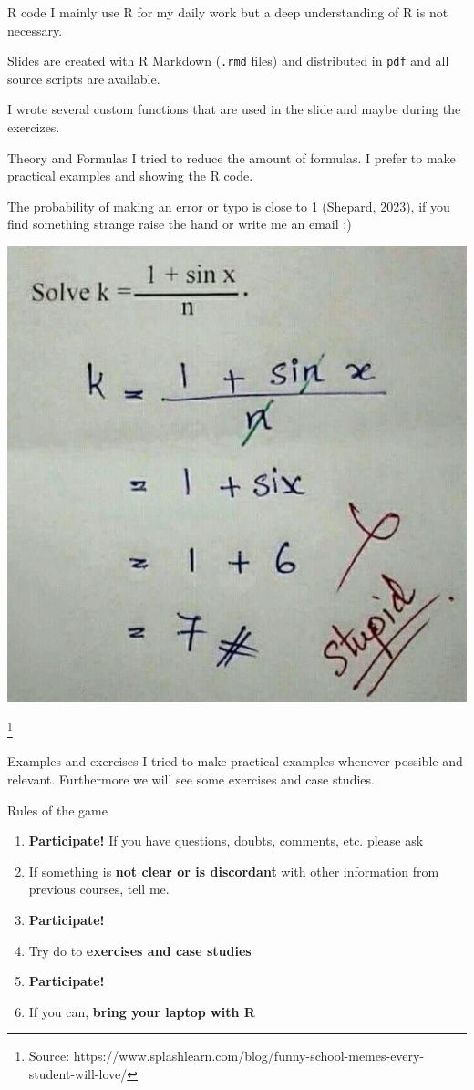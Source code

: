 \documentclass[
  ignorenonframetext,
]{beamer}
\providecommand{\tightlist}{%
  \setlength{\itemsep}{0pt}\setlength{\parskip}{0pt}}
\newcommand\addnote[1]{%
  \begingroup
  \renewcommand\thefootnote{}\footnote{#1}%
  \addtocounter{footnote}{-1}%
  \endgroup
}
\begin{document}
\begin{frame}[fragile]{R code}
\protect\hypertarget{r-code}{}
I mainly use R for my daily work but a deep understanding of R is not
necessary.

Slides are created with R Markdown (\texttt{.rmd} files) and distributed
in \texttt{pdf} and all source scripts are available.

I wrote several custom functions that are used in the slide and maybe
during the exercizes.
\end{frame}

\begin{frame}{Theory and Formulas}
\protect\hypertarget{theory-and-formulas}{}
I tried to reduce the amount of formulas. I prefer to make practical
examples and showing the R code.

The probability of making an error or typo is close to 1 (Shepard,
2023), if you find something strange raise the hand or write me an email
:)

\begin{center}\includegraphics[width=0.3\linewidth]{img/meme-math} \end{center}

\addnote{Source: https://www.splashlearn.com/blog/funny-school-memes-every-student-will-love/}
\end{frame}

\begin{frame}{Examples and exercises}
\protect\hypertarget{examples-and-exercises}{}
I tried to make practical examples whenever possible and relevant.
Furthermore we will see some exercises and case studies.
\end{frame}

\begin{frame}{Rules of the game}
\protect\hypertarget{rules-of-the-game}{}
\begin{enumerate}
\tightlist
\item
  \textbf{Participate!} If you have questions, doubts, comments, etc.
  please ask
\item
  If something is \textbf{not clear or is discordant} with other
  information from previous courses, tell me.
\item
  \textbf{Participate!}
\item
  Try do to \textbf{exercises and case studies}
\item
  \textbf{Participate!}
\item
  If you can, \textbf{bring your laptop with R}
\end{enumerate}
\end{frame}
\end{document}

